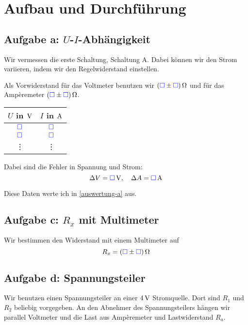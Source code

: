 \documentclass[11pt, ngerman]{article}
\newcommand{\messwert}{\textcolor{blue}{\square}}
\begin{document}
\section{Aufbau und Durchführung}

\subsection{Aufgabe a: $U$-$I$-Abhängigkeit}

\label{durchführung-a}

Wir vermessen die erste Schaltung, Schaltung A. Dabei können wir den Strom variieren, indem wir den Regelwiderstand einstellen.

Als Vorwiderstand für das Voltmeter benutzen wir $\unit[(\messwert \pm
\messwert)] \Omega$ und für das Ampèremeter $\unit[(\messwert \pm \messwert)]
\Omega$.

\begin{center}
	\begin{tabular}{cc}
		$U$ in $\unit V$ & $I$ in $\unit A$ \\
		\hline
		$\messwert$ & $\messwert$ \\
		$\messwert$ & $\messwert$ \\
			 \vdots & \vdots
	\end{tabular}
\end{center}

Dabei sind die Fehler in Spannung und Strom:
\[ \Delta V = \unit[\messwert]V, \quad \Delta A = \unit[\messwert] A \]

Diese Daten werte ich in \ref{auswertung-a} aus.

\subsection{Aufgabe c: $R_x$ mit Multimeter}

Wir bestimmen den Widerstand mit einem Multimeter auf
\[ R_x = \unit[(\messwert \pm \messwert)]{\Omega} \]

\subsection{Aufgabe d: Spannungsteiler}

\label{durchführung-d}

Wir benutzen einen Spannungsteiler an einer $\unit[4]V$ Stromquelle. Dort sind
$R_1$ und $R_2$ beliebig vorgegeben. An den Abnehmer des Spannungsteilers
hängen wir parallel Voltmeter und die Last aus Ampèremeter und Lastwiderstand
$R_a$.
\end{document}
